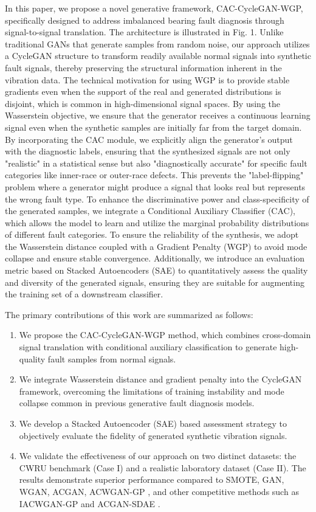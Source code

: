 In this paper, we propose a novel generative framework, CAC-CycleGAN-WGP, specifically designed to address imbalanced bearing fault diagnosis through signal-to-signal translation. The architecture is illustrated in Fig. 1. Unlike traditional GANs that generate samples from random noise, our approach utilizes a CycleGAN \cite{4} structure to transform readily available normal signals into synthetic fault signals, thereby preserving the structural information inherent in the vibration data. The technical motivation for using WGP is to provide stable gradients even when the support of the real and generated distributions is disjoint, which is common in high-dimensional signal spaces. By using the Wasserstein objective, we ensure that the generator receives a continuous learning signal even when the synthetic samples are initially far from the target domain. By incorporating the CAC module, we explicitly align the generator's output with the diagnostic labels, ensuring that the synthesized signals are not only "realistic" in a statistical sense but also "diagnostically accurate" for specific fault categories like inner-race or outer-race defects. This prevents the "label-flipping" problem where a generator might produce a signal that looks real but represents the wrong fault type. To enhance the discriminative power and class-specificity of the generated samples, we integrate a Conditional Auxiliary Classifier (CAC), which allows the model to learn and utilize the marginal probability distributions of different fault categories. To ensure the reliability of the synthesis, we adopt the Wasserstein distance coupled with a Gradient Penalty (WGP) to avoid mode collapse and ensure stable convergence. Additionally, we introduce an evaluation metric based on Stacked Autoencoders (SAE) \cite{44} to quantitatively assess the quality and diversity of the generated signals, ensuring they are suitable for augmenting the training set of a downstream classifier.

The primary contributions of this work are summarized as follows:
\begin{enumerate}
    \item We propose the CAC-CycleGAN-WGP method, which combines cross-domain signal translation with conditional auxiliary classification to generate high-quality fault samples from normal signals.
    \item We integrate Wasserstein distance and gradient penalty into the CycleGAN framework, overcoming the limitations of training instability and mode collapse common in previous generative fault diagnosis models.
    \item We develop a Stacked Autoencoder (SAE) based assessment strategy to objectively evaluate the fidelity of generated synthetic vibration signals.
    \item We validate the effectiveness of our approach on two distinct datasets: the CWRU benchmark (Case I) and a realistic laboratory dataset (Case II). The results demonstrate superior performance compared to SMOTE, GAN, WGAN, ACGAN, ACWGAN-GP \cite{35}, and other competitive methods such as IACWGAN-GP \cite{26} and ACGAN-SDAE \cite{21}.
\end{enumerate}

